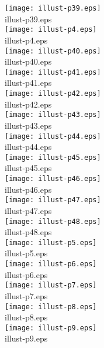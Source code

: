 \texttt{[image: illust-p39.eps]}\\illust-p39.eps\\


\texttt{[image: illust-p4.eps]}\\illust-p4.eps\\


\texttt{[image: illust-p40.eps]}\\illust-p40.eps\\


\texttt{[image: illust-p41.eps]}\\illust-p41.eps\\


\texttt{[image: illust-p42.eps]}\\illust-p42.eps\\


\texttt{[image: illust-p43.eps]}\\illust-p43.eps\\


\texttt{[image: illust-p44.eps]}\\illust-p44.eps\\


\texttt{[image: illust-p45.eps]}\\illust-p45.eps\\


\texttt{[image: illust-p46.eps]}\\illust-p46.eps\\


\texttt{[image: illust-p47.eps]}\\illust-p47.eps\\


\texttt{[image: illust-p48.eps]}\\illust-p48.eps\\


\texttt{[image: illust-p5.eps]}\\illust-p5.eps\\


\texttt{[image: illust-p6.eps]}\\illust-p6.eps\\


\texttt{[image: illust-p7.eps]}\\illust-p7.eps\\


\texttt{[image: illust-p8.eps]}\\illust-p8.eps\\


\texttt{[image: illust-p9.eps]}\\illust-p9.eps\\


